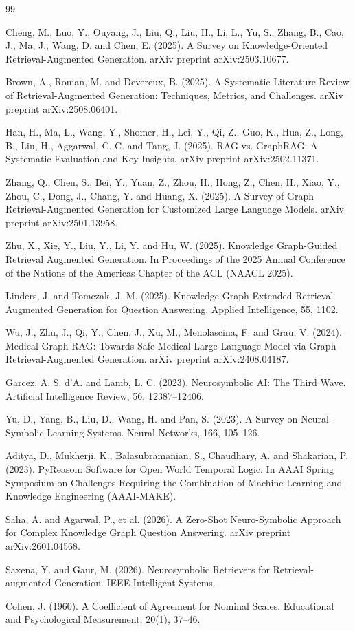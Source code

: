 \documentclass[12pt]{article}
\begin{document}
\begin{thebibliography}{99}

Cheng, M., Luo, Y., Ouyang, J., Liu, Q., Liu, H., Li, L., Yu, S., Zhang, B., Cao, J., Ma, J., Wang, D. and Chen, E. (2025). A Survey on Knowledge-Oriented Retrieval-Augmented Generation. arXiv preprint arXiv:2503.10677.

Brown, A., Roman, M. and Devereux, B. (2025). A Systematic Literature Review of Retrieval-Augmented Generation: Techniques, Metrics, and Challenges. arXiv preprint arXiv:2508.06401.

Han, H., Ma, L., Wang, Y., Shomer, H., Lei, Y., Qi, Z., Guo, K., Hua, Z., Long, B., Liu, H., Aggarwal, C. C. and Tang, J. (2025). RAG vs. GraphRAG: A Systematic Evaluation and Key Insights. arXiv preprint arXiv:2502.11371.

Zhang, Q., Chen, S., Bei, Y., Yuan, Z., Zhou, H., Hong, Z., Chen, H., Xiao, Y., Zhou, C., Dong, J., Chang, Y. and Huang, X. (2025). A Survey of Graph Retrieval-Augmented Generation for Customized Large Language Models. arXiv preprint arXiv:2501.13958.

Zhu, X., Xie, Y., Liu, Y., Li, Y. and Hu, W. (2025). Knowledge Graph-Guided Retrieval Augmented Generation. In Proceedings of the 2025 Annual Conference of the Nations of the Americas Chapter of the ACL (NAACL 2025).

Linders, J. and Tomczak, J. M. (2025). Knowledge Graph-Extended Retrieval Augmented Generation for Question Answering. Applied Intelligence, 55, 1102.

Wu, J., Zhu, J., Qi, Y., Chen, J., Xu, M., Menolascina, F. and Grau, V. (2024). Medical Graph RAG: Towards Safe Medical Large Language Model via Graph Retrieval-Augmented Generation. arXiv preprint arXiv:2408.04187.

Garcez, A. S. d'A. and Lamb, L. C. (2023). Neurosymbolic AI: The Third Wave. Artificial Intelligence Review, 56, 12387--12406.

Yu, D., Yang, B., Liu, D., Wang, H. and Pan, S. (2023). A Survey on Neural-Symbolic Learning Systems. Neural Networks, 166, 105--126.

Aditya, D., Mukherji, K., Balasubramanian, S., Chaudhary, A. and Shakarian, P. (2023). PyReason: Software for Open World Temporal Logic. In AAAI Spring Symposium on Challenges Requiring the Combination of Machine Learning and Knowledge Engineering (AAAI-MAKE).

Saha, A. and Agarwal, P., et al. (2026). A Zero-Shot Neuro-Symbolic Approach for Complex Knowledge Graph Question Answering. arXiv preprint arXiv:2601.04568.

Saxena, Y. and Gaur, M. (2026). Neurosymbolic Retrievers for Retrieval-augmented Generation. IEEE Intelligent Systems.

Cohen, J. (1960). A Coefficient of Agreement for Nominal Scales. Educational and Psychological Measurement, 20(1), 37--46.

\end{thebibliography}
\end{document}
